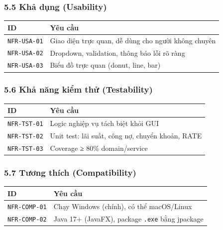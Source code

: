 \documentclass[11pt,a4paper]{article}
\newcounter{none}
\begin{document}
\subsubsection{5.5 Khả dụng (Usability)}\label{khux1ea3-dux1ee5ng-usability}

{\def\LTcaptype{none}
\begin{longtable}[]{@{}
  >{\raggedright\arraybackslash}p{}
  >{\raggedright\arraybackslash}p{}@{}}
\toprule\noalign{}
ID & Yêu cầu \\
\midrule\noalign{}
\endhead
\bottomrule\noalign{}
\endlastfoot
\texttt{NFR-USA-01} & Giao diện trực quan, dễ dùng cho người không chuyên \\ 
\texttt{NFR-USA-02} & Dropdown, validation, thông báo lỗi rõ ràng \\ 
\texttt{NFR-USA-03} & Biểu đồ trực quan (donut, line, bar) \\
\end{longtable}
}

\subsubsection{5.6 Khả năng kiểm thử (Testability)}\label{khux1ea3-nux103ng-kiux1ec3m-thux1eed-testability}

{\def\LTcaptype{none}
\begin{longtable}[]{@{}
  >{\raggedright\arraybackslash}p{}
  >{\raggedright\arraybackslash}p{}@{}}
\toprule\noalign{}
ID & Yêu cầu \\
\midrule\noalign{}
\endhead
\bottomrule\noalign{}
\endlastfoot
\texttt{NFR-TST-01} & Logic nghiệp vụ tách biệt khỏi GUI \\ 
\texttt{NFR-TST-02} & Unit test: lãi suất, công nợ, chuyển khoản, RATE \\ 
\texttt{NFR-TST-03} & Coverage ≥ 80\% domain/service \\
\end{longtable}
}

\subsubsection{5.7 Tương thích (Compatibility)}\label{tux1b0ux1a1ng-thuxedch-compatibility}

{\def\LTcaptype{none}
\begin{longtable}[]{@{}
  >{\raggedright\arraybackslash}p{}
  >{\raggedright\arraybackslash}p{}@{}}
\toprule\noalign{}
ID & Yêu cầu \\
\midrule\noalign{}
\endhead
\bottomrule\noalign{}
\endlastfoot
\texttt{NFR-COMP-01} & Chạy Windows (chính), có thể macOS/Linux \\ 
\texttt{NFR-COMP-02} & Java 17+ (JavaFX), package \texttt{.exe} bằng jpackage \\
\end{longtable}
}
\end{document}
